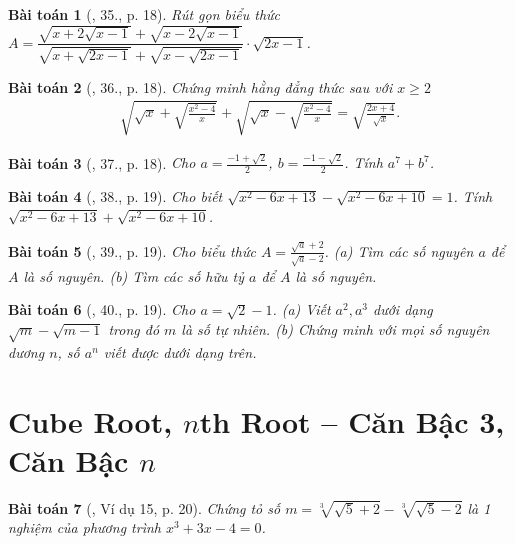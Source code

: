 \documentclass{article}
\newtheorem{baitoan}{Bài toán}
\begin{document}
\begin{baitoan}[\cite{Binh_Toan_9_tap_1}, 35., p. 18]
	Rút gọn biểu thức $A = \dfrac{\sqrt{x + 2\sqrt{x - 1}} + \sqrt{x - 2\sqrt{x - 1}}}{\sqrt{x + \sqrt{2x - 1}} + \sqrt{x - \sqrt{2x - 1}}}\cdot\sqrt{2x - 1}$.
\end{baitoan}

\begin{baitoan}[\cite{Binh_Toan_9_tap_1}, 36., p. 18]
	Chứng minh hằng đẳng thức sau với $x\ge2$
	\begin{align*}
		\sqrt{\sqrt{x} + \sqrt{\frac{x^2 - 4}{x}}} + \sqrt{\sqrt{x} - \sqrt{\frac{x^2 - 4}{x}}} = \sqrt{\frac{2x + 4}{\sqrt{x}}}.
	\end{align*}
\end{baitoan}

\begin{baitoan}[\cite{Binh_Toan_9_tap_1}, 37., p. 18]
	Cho $a = \frac{-1 + \sqrt{2}}{2}$, $b = \frac{-1 - \sqrt{2}}{2}$. Tính $a^7 + b^7$.
\end{baitoan}

\begin{baitoan}[\cite{Binh_Toan_9_tap_1}, 38., p. 19]
	Cho biết $\sqrt{x^2 - 6x + 13} - \sqrt{x^2 - 6x + 10} = 1$. Tính $\sqrt{x^2 - 6x + 13} + \sqrt{x^2 - 6x + 10}$.
\end{baitoan}

\begin{baitoan}[\cite{Binh_Toan_9_tap_1}, 39., p. 19]
	Cho biểu thức $A = \frac{\sqrt{a} + 2}{\sqrt{a} - 2}$. (a) Tìm các số nguyên $a$ để $A$ là số nguyên. (b) Tìm các số hữu tỷ $a$ để $A$ là số nguyên.
\end{baitoan}

\begin{baitoan}[\cite{Binh_Toan_9_tap_1}, 40., p. 19]
	Cho $a = \sqrt{2} - 1$. (a) Viết $a^2,a^3$ dưới dạng $\sqrt{m} - \sqrt{m - 1}$ trong đó $m$ là số tự nhiên. (b) Chứng minh với mọi số nguyên dương $n$, số $a^n$ viết được dưới dạng trên.
\end{baitoan}


\section{Cube Root, $n$th Root -- Căn Bậc 3, Căn Bậc $n$}

\begin{baitoan}[\cite{Binh_Toan_9_tap_1}, Ví dụ 15, p. 20]
	Chứng tỏ số $m = \sqrt[3]{\sqrt{5} + 2} - \sqrt[3]{\sqrt{5} - 2}$ là 1 nghiệm của phương trình $x^3 + 3x - 4 = 0$.
\end{baitoan}
\end{document}
